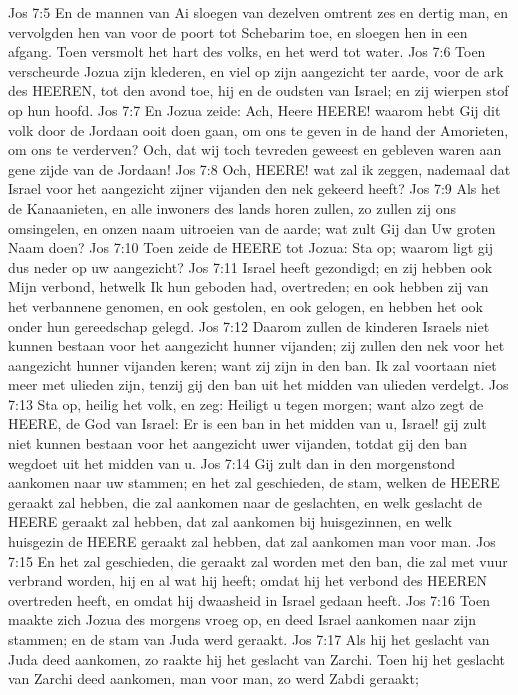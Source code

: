 Jos 7:5  En de mannen van Ai sloegen van dezelven omtrent zes en dertig man, en vervolgden hen van voor de poort tot Schebarim toe, en sloegen hen in een afgang. Toen versmolt het hart des volks, en het werd tot water.
Jos 7:6  Toen verscheurde Jozua zijn klederen, en viel op zijn aangezicht ter aarde, voor de ark des HEEREN, tot den avond toe, hij en de oudsten van Israel; en zij wierpen stof op hun hoofd.
Jos 7:7  En Jozua zeide: Ach, Heere HEERE! waarom hebt Gij dit volk door de Jordaan ooit doen gaan, om ons te geven in de hand der Amorieten, om ons te verderven? Och, dat wij toch tevreden geweest en gebleven waren aan gene zijde van de Jordaan!
Jos 7:8  Och, HEERE! wat zal ik zeggen, nademaal dat Israel voor het aangezicht zijner vijanden den nek gekeerd heeft?
Jos 7:9  Als het de Kanaanieten, en alle inwoners des lands horen zullen, zo zullen zij ons omsingelen, en onzen naam uitroeien van de aarde; wat zult Gij dan Uw groten Naam doen?
Jos 7:10  Toen zeide de HEERE tot Jozua: Sta op; waarom ligt gij dus neder op uw aangezicht?
Jos 7:11  Israel heeft gezondigd; en zij hebben ook Mijn verbond, hetwelk Ik hun geboden had, overtreden; en ook hebben zij van het verbannene genomen, en ook gestolen, en ook gelogen, en hebben het ook onder hun gereedschap gelegd.
Jos 7:12  Daarom zullen de kinderen Israels niet kunnen bestaan voor het aangezicht hunner vijanden; zij zullen den nek voor het aangezicht hunner vijanden keren; want zij zijn in den ban. Ik zal voortaan niet meer met ulieden zijn, tenzij gij den ban uit het midden van ulieden verdelgt.
Jos 7:13  Sta op, heilig het volk, en zeg: Heiligt u tegen morgen; want alzo zegt de HEERE, de God van Israel: Er is een ban in het midden van u, Israel! gij zult niet kunnen bestaan voor het aangezicht uwer vijanden, totdat gij den ban wegdoet uit het midden van u.
Jos 7:14  Gij zult dan in den morgenstond aankomen naar uw stammen; en het zal geschieden, de stam, welken de HEERE geraakt zal hebben, die zal aankomen naar de geslachten, en welk geslacht de HEERE geraakt zal hebben, dat zal aankomen bij huisgezinnen, en welk huisgezin de HEERE geraakt zal hebben, dat zal aankomen man voor man.
Jos 7:15  En het zal geschieden, die geraakt zal worden met den ban, die zal met vuur verbrand worden, hij en al wat hij heeft; omdat hij het verbond des HEEREN overtreden heeft, en omdat hij dwaasheid in Israel gedaan heeft.
Jos 7:16  Toen maakte zich Jozua des morgens vroeg op, en deed Israel aankomen naar zijn stammen; en de stam van Juda werd geraakt.
Jos 7:17  Als hij het geslacht van Juda deed aankomen, zo raakte hij het geslacht van Zarchi. Toen hij het geslacht van Zarchi deed aankomen, man voor man, zo werd Zabdi geraakt;
